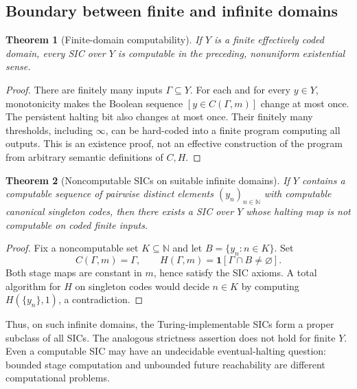 \documentclass[11pt,letterpaper]{article}
\newtheorem{theorem}{Theorem}[section]\newtheorem{proposition}[theorem]{Proposition}\newtheorem{lemma}[theorem]{Lemma}\newtheorem{corollary}[theorem]{Corollary}\newtheorem{conjecture}[theorem]{Conjecture}\theoremstyle{definition}\newtheorem{definition}[theorem]{Definition}\newtheorem{example}[theorem]{Example}\newtheorem{remark}[theorem]{Remark}
\newcommand{\NN}{\mathbb N}\newcommand{\Nplus}{\mathbb N_{+}}\newcommand{\Pow}{\mathcal P}\newcommand{\Con}{\operatorname{Con}}\newcommand{\Self}{\operatorname{Self}}\newcommand{\lev}{\operatorname{lev}}\newcommand{\Lang}{\mathcal L}\newcommand{\Prv}{\mathsf{Pr}}\newcommand{\ATP}{\mathsf{ATP}}\newcommand{\SA}{\mathsf{SA}}\newcommand{\OM}{\operatorname{Out}}\newcommand{\Tg}{\operatorname{Tag}}\newcommand{\eqSA}{\sim_{\!\mathrm{SA}}^{\mathrm{adm}}}\newcommand{\preSA}{\preccurlyeq_{\!\mathrm{SA}}^{\mathrm{adm}}}
\begin{document}
\subsection{Boundary between finite and infinite domains}
\begin{theorem}[Finite-domain computability]
If $Y$ is a finite effectively coded domain, every SIC over $Y$ is computable in the preceding, nonuniform existential sense.
\end{theorem}
\begin{proof}
There are finitely many inputs $\Gamma\subseteq Y$. For each and for every $y\in Y$, monotonicity makes the Boolean sequence $[y\in C(\Gamma,m)]$ change at most once. The persistent halting bit also changes at most once. Their finitely many thresholds, including $\infty$, can be hard-coded into a finite program computing all outputs. This is an existence proof, not an effective construction of the program from arbitrary semantic definitions of $C,H$.
\end{proof}
\begin{theorem}[Noncomputable SICs on suitable infinite domains]
If $Y$ contains a computable sequence of pairwise distinct elements $(y_n)_{n\in\NN}$ with computable canonical singleton codes, then there exists a SIC over $Y$ whose halting map is not computable on coded finite inputs.
\end{theorem}
\begin{proof}
Fix a noncomputable set $K\subseteq\NN$ and let $B=\{y_n:n\in K\}$. Set
\[
C(\Gamma,m)=\Gamma,\qquad H(\Gamma,m)=\mathbf1[\Gamma\cap B\ne\varnothing].
\]
Both stage maps are constant in $m$, hence satisfy the SIC axioms. A total algorithm for $H$ on singleton codes would decide $n\in K$ by computing $H(\{y_n\},1)$, a contradiction.
\end{proof}
Thus, on such infinite domains, the Turing-implementable SICs form a proper subclass of all SICs. The analogous strictness assertion does not hold for finite $Y$. Even a computable SIC may have an undecidable eventual-halting question: bounded stage computation and unbounded future reachability are different computational problems.
\end{document}
